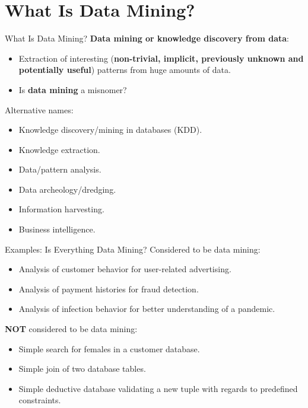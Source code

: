 \section{What Is Data Mining?}

\begin{frame}{What Is Data Mining?}
	\textbf{Data mining or knowledge discovery from data}:
	\begin{itemize}
		\item Extraction of interesting (\textbf{non-trivial, implicit,
			      previously unknown and potentially useful}) patterns from huge amounts
		      of data.
		\item Is \textbf{data mining} a misnomer?
	\end{itemize}
	Alternative names:
	\begin{itemize}
		\item Knowledge discovery/mining in databases (KDD).
		\item Knowledge extraction.
		\item Data/pattern analysis.
		\item Data archeology/dredging.
		\item Information harvesting.
		\item Business intelligence.
	\end{itemize}
\end{frame}

\begin{frame}{Examples: Is Everything Data Mining?}
	Considered to be data mining:
	\begin{itemize}
		\item Analysis of customer behavior for user-related advertising.
		\item Analysis of payment histories for fraud detection.
		\item Analysis of infection behavior for better understanding of a
		      pandemic.
	\end{itemize}
	\textbf{NOT} considered to be data mining:
	\begin{itemize}
		\item Simple search for females in a customer database.
		\item Simple join of two database tables.
		\item Simple deductive database validating a new tuple with regards to
		      predefined constraints.
	\end{itemize}
\end{frame}


